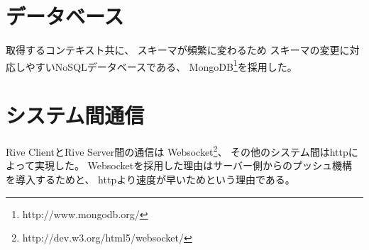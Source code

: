 \section{データベース}
取得するコンテキスト共に、
スキーマが頻繁に変わるため
スキーマの変更に対応しやすいNoSQLデータベースである、
MongoDB\footnote{http://www.mongodb.org/}を採用した。

\section{システム間通信}
Rive ClientとRive Server間の通信は
Websocket\footnote{http://dev.w3.org/html5/websocket/}、
その他のシステム間はhttpによって実現した。
Websocketを採用した理由はサーバー側からのプッシュ機構
を導入するためと、
httpより速度が早いためという理由である。\cite{websocket}
